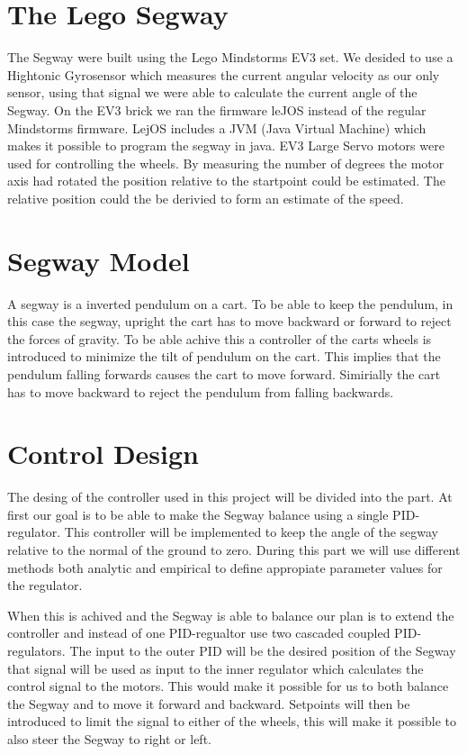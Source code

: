  \section{The Lego Segway}
 The Segway were built using the Lego Mindstorms EV3 set. We desided to use a Hightonic Gyrosensor which measures the current angular velocity as our only sensor, using that signal we were able to calculate the current angle of the Segway. On the EV3 brick we ran the firmware leJOS instead of the regular Mindstorms firmware. LejOS includes a JVM (Java Virtual Machine) which makes it possible to program the segway in java. EV3 Large Servo motors were used for controlling the wheels. By measuring the number of degrees the motor axis had rotated the position relative to the startpoint could be estimated. The relative position could the be derivied to form an estimate of the speed. 

\section{Segway Model}
A segway is a inverted pendulum on a cart. To be able to keep the pendulum, in this case the segway, upright the cart has to move backward or forward to reject the forces of gravity. To be able achive this a controller of the carts wheels is introduced to minimize the tilt of pendulum on the cart. This implies that the pendulum falling forwards causes the cart to move forward. Simirially the cart has to move backward to reject the pendulum from falling backwards. 


\section{Control Design}
The desing of the controller used in this project will be divided into the part. 
At first our goal is to be able to make the Segway balance using a single PID-regulator. This controller will be implemented to keep the angle of the segway relative to the normal of the ground to zero. During this part we will use different methods both analytic and empirical to define appropiate parameter values for the regulator.

 When this is achived and the Segway is able to balance our plan is to extend the controller and instead of one PID-regualtor use two cascaded coupled PID-regulators. The input to the outer PID will be the desired position of the Segway that signal will be used as input to the inner regulator which calculates the control signal to the motors. This would make it possible for us to both balance the Segway and to move it forward and backward. Setpoints will then be introduced to limit the signal to either of the wheels, this will make it possible to also steer the Segway to right or left.



